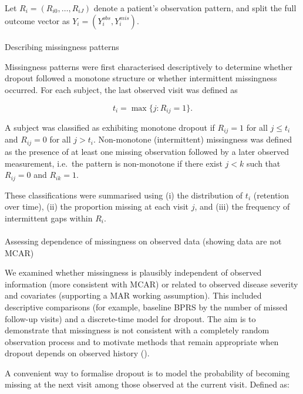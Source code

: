 \documentclass[
  9pt,
  letterpaper,
  DIV=11,
  numbers=noendperiod]{scrartcl}
\makeatletter
\let\oldparagraph\paragraph
\renewcommand{\paragraph}{
    \@ifstar
      \xxxParagraphStar
      \xxxParagraphNoStar
  }
\newcommand{\xxxParagraphStar}[1]{\oldparagraph*{#1}\mbox{}}
\newcommand{\xxxParagraphNoStar}[1]{\oldparagraph{#1}\mbox{}}
\makeatother
\begin{document}
Let \(R_i=(R_{i0},\dots,R_{iJ})\) denote a patient's observation
pattern, and split the full outcome vector as
\(Y_i=(Y_i^{obs},Y_i^{mis})\).

\paragraph{Describing missingness
patterns}\label{describing-missingness-patterns}

Missingness patterns were first characterised descriptively to determine
whether dropout followed a monotone structure or whether intermittent
missingness occurred. For each subject, the last observed visit was
defined as

\[
t_i = \max\{j : R_{ij}=1\}.
\]

A subject was classified as exhibiting monotone dropout if \(R_{ij}=1\)
for all \(j \le t_i\) and \(R_{ij}=0\) for all \(j > t_i\). Non-monotone
(intermittent) missingness was defined as the presence of at least one
missing observation followed by a later observed measurement, i.e.~the
pattern is non-monotone if there exist \(j<k\) such that \(R_{ij}=0\)
and \(R_{ik}=1\).

These classifications were summarised using (i) the distribution of
\(t_i\) (retention over time), (ii) the proportion missing at each visit
\(j\), and (iii) the frequency of intermittent gaps within \(R_i\).

\paragraph{Assessing dependence of missingness on observed data (showing
data are not
MCAR)}\label{assessing-dependence-of-missingness-on-observed-data-showing-data-are-not-mcar}

We examined whether missingness is plausibly independent of observed
information (more consistent with MCAR) or related to observed disease
severity and covariates (supporting a MAR working assumption). This
included descriptive comparisons (for example, baseline BPRS by the
number of missed follow-up visits) and a discrete-time model for
dropout. The aim is to demonstrate that missingness is not consistent
with a completely random observation process and to motivate methods
that remain appropriate when dropout depends on observed history
().

A convenient way to formalise dropout is to model the probability of
becoming missing at the next visit among those observed at the current
visit. Defined as:
\end{document}

